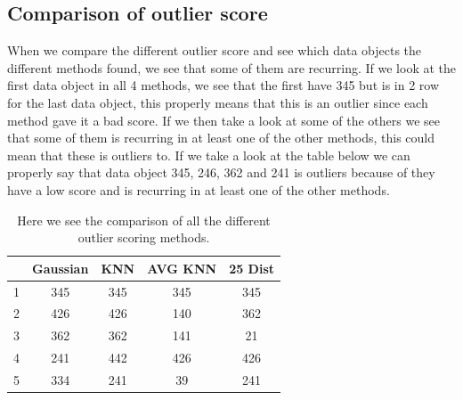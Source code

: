 \subsection{Comparison of outlier score}

When we compare the different outlier score and see which data objects the different methods found, we see that some of them are recurring. If we look at the first data object in all 4 methods, we see that the first have 345 but is in 2 row for the last data object, this properly means that this is an outlier since each method gave it a bad score. If we then take a look at some of the others we see that some of them is recurring in at least one of the other methods, this could mean that these is outliers to. If we take a look at the table below we can properly say that data object 345, 246, 362 and 241 is outliers because of they have a low score and is recurring in at least one of the other methods.
\begin{table}[H]
\begin{longtable}{lcccc}
\hline
  & Gaussian & KNN & AVG KNN & 25 Dist \\ \hline
1 & 345      & 345 & 345     & 345 \\ 
2 & 426      & 426 & 140     & 362 \\ 
3 & 362      & 362 & 141     & 21 \\ 
4 & 241      & 442 & 426     & 426 \\ 
5 & 334      & 241 & 39      & 241 \\ \hline
\end{longtable}
\caption{\footnotesize Here we see the comparison of all the different outlier scoring methods.}
\end{table}